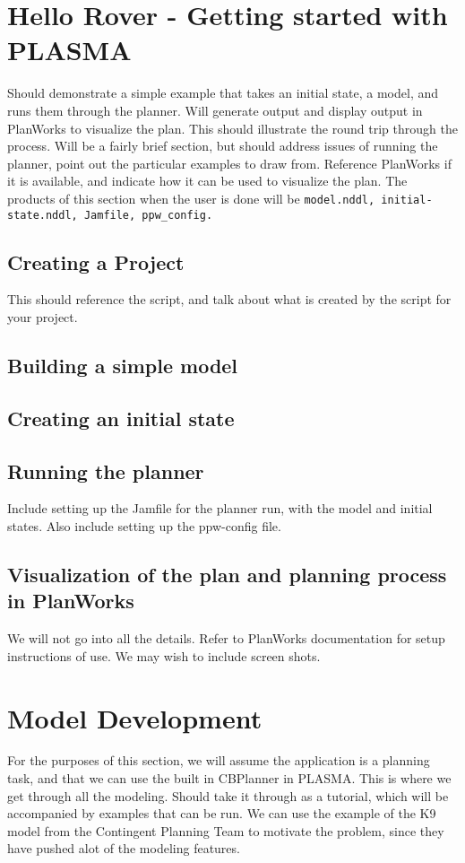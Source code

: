 \documentclass[10pt, letterpaper, twoside]{article}
\begin{document}
\section{Hello Rover - Getting started with PLASMA}
Should demonstrate a simple example that takes an initial state, a model, and runs them through the planner. Will generate output and display output in PlanWorks to visualize the plan. This should illustrate the round trip through the process. Will be a fairly brief section, but should address issues of running the planner, point out the particular examples to draw from. Reference PlanWorks if it is available, and indicate how it can be used to visualize the plan. The products of this section when the user is done will be \verb!model.nddl, initial-state.nddl, Jamfile, ppw_config.!

\subsection{Creating a Project}
This should reference the script, and talk about what is created by the script for your project.
\subsection{Building a simple model}
\subsection{Creating an initial state}
\subsection{Running the planner}
Include setting up the Jamfile for the planner run, with the model and initial states. Also include setting up the ppw-config file.
\subsection{Visualization of the plan and planning process in PlanWorks}
We will not go into all the details. Refer to PlanWorks documentation for setup instructions of use. We may wish to include screen shots.

\section{Model Development}
For the purposes of this section, we will assume the application is a planning task, and that we can use the built in CBPlanner in PLASMA.
This is where we get through all the modeling. Should take it through as a tutorial, which will be accompanied by examples that can be run. We can use the example of the K9 model from the Contingent Planning Team to motivate the problem, since they have pushed alot of the modeling features.
\end{document}

